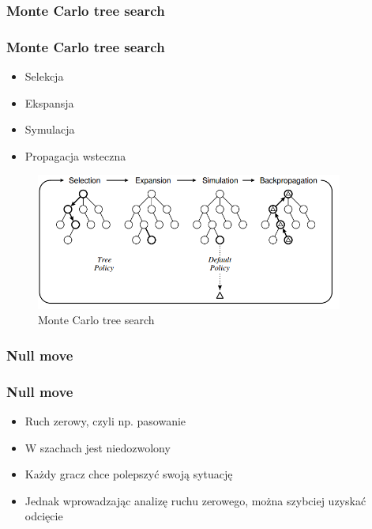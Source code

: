 \documentclass[polish,envcountsect,10pt]{beamer}
\begin{document}
            \subsubsection{Monte Carlo tree search}
                \begin{frame}
                    \frametitle{Monte Carlo tree search}
                    \begin{itemize}
                        \item<1-> Selekcja
                        \item<2-> Ekspansja 
                        \item<3-> Symulacja 
                        \item<4-> Propagacja wsteczna                         
                    \end{itemize}
                    
                    \begin{figure}[H]
                        \centering
                        \includegraphics[width=0.9\textwidth]{images/mcts}
                        \caption{Monte Carlo tree search}
                    \end{figure}
                    
                \end{frame}
            \subsubsection{Null move}
            \begin{frame}
                \frametitle{Null move}
                \begin{itemize}
                    \item<1-> Ruch zerowy, czyli np. pasowanie
                    \item<2-> W szachach jest niedozwolony
                    \item<3-> Każdy gracz chce polepszyć swoją sytuację
                    \item<4-> Jednak wprowadzając analizę ruchu zerowego, można szybciej uzyskać odcięcie
                \end{itemize}
            \end{frame}
\end{document}
